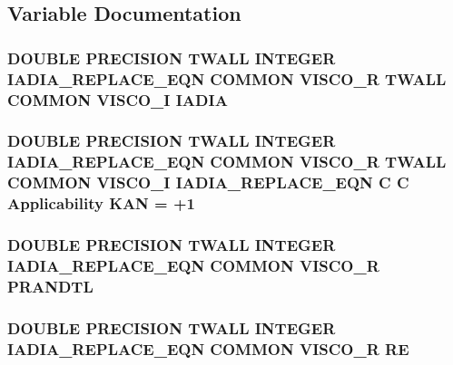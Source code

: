 \subsection{Variable Documentation}
\hypertarget{visco_8com_aac6f06569f9c01d0b51c03f107eb2693}{
\subsubsection[{I\-A\-D\-I\-A}]{\setlength{\rightskip}{0pt plus 5cm}D\-O\-U\-B\-L\-E P\-R\-E\-C\-I\-S\-I\-O\-N T\-W\-A\-L\-L I\-N\-T\-E\-G\-E\-R I\-A\-D\-I\-A\-\_\-\-R\-E\-P\-L\-A\-C\-E\-\_\-\-E\-Q\-N C\-O\-M\-M\-O\-N V\-I\-S\-C\-O\-\_\-\-R T\-W\-A\-L\-L C\-O\-M\-M\-O\-N V\-I\-S\-C\-O\-\_\-\-I I\-A\-D\-I\-A}}\label{visco_8com_aac6f06569f9c01d0b51c03f107eb2693}
\hypertarget{visco_8com_a5f14ddc0c5ad4e7f0d7ed332eeafbbcb}{
\subsubsection[{K\-A\-N}]{\setlength{\rightskip}{0pt plus 5cm}D\-O\-U\-B\-L\-E P\-R\-E\-C\-I\-S\-I\-O\-N T\-W\-A\-L\-L I\-N\-T\-E\-G\-E\-R I\-A\-D\-I\-A\-\_\-\-R\-E\-P\-L\-A\-C\-E\-\_\-\-E\-Q\-N C\-O\-M\-M\-O\-N V\-I\-S\-C\-O\-\_\-\-R T\-W\-A\-L\-L C\-O\-M\-M\-O\-N V\-I\-S\-C\-O\-\_\-\-I I\-A\-D\-I\-A\-\_\-\-R\-E\-P\-L\-A\-C\-E\-\_\-\-E\-Q\-N C C Applicability K\-A\-N = +1}}\label{visco_8com_a5f14ddc0c5ad4e7f0d7ed332eeafbbcb}
\hypertarget{visco_8com_a230c5bd89486988c1c250f8d67ed6266}{
\subsubsection[{P\-R\-A\-N\-D\-T\-L}]{\setlength{\rightskip}{0pt plus 5cm}D\-O\-U\-B\-L\-E P\-R\-E\-C\-I\-S\-I\-O\-N T\-W\-A\-L\-L I\-N\-T\-E\-G\-E\-R I\-A\-D\-I\-A\-\_\-\-R\-E\-P\-L\-A\-C\-E\-\_\-\-E\-Q\-N C\-O\-M\-M\-O\-N V\-I\-S\-C\-O\-\_\-\-R P\-R\-A\-N\-D\-T\-L}}\label{visco_8com_a230c5bd89486988c1c250f8d67ed6266}
\hypertarget{visco_8com_acee3bf3b2f2eee0ca24fa7fcea80bf5e}{
\subsubsection[{R\-E}]{\setlength{\rightskip}{0pt plus 5cm}D\-O\-U\-B\-L\-E P\-R\-E\-C\-I\-S\-I\-O\-N T\-W\-A\-L\-L I\-N\-T\-E\-G\-E\-R I\-A\-D\-I\-A\-\_\-\-R\-E\-P\-L\-A\-C\-E\-\_\-\-E\-Q\-N C\-O\-M\-M\-O\-N V\-I\-S\-C\-O\-\_\-\-R R\-E}}\label{visco_8com_acee3bf3b2f2eee0ca24fa7fcea80bf5e}
